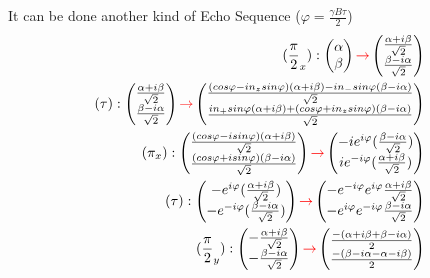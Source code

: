 \documentclass{article}
\begin{document}
It can be done another kind of Echo Sequence ($\varphi=\frac{\gamma B\tau}{2}$)
\begin{equation}\label{eq30}\begin{aligned}
(\frac{\pi}{2}_x):\begin{pmatrix}\alpha \\\beta  \end{pmatrix}\textcolor{red}{\rightarrow}\begin{pmatrix}\frac{\alpha+i\beta}{\sqrt{2}} \\ \frac{\beta-i\alpha}{\sqrt{2}} \end{pmatrix}\\
(\tau):\begin{pmatrix}\frac{\alpha+i\beta}{\sqrt{2}}\\ \frac{\beta-i\alpha}{\sqrt{2}} \end{pmatrix}\textcolor{red}{\rightarrow}\begin{pmatrix}\frac{(cos\varphi-in_zsin\varphi)(\alpha+i\beta)-in_-sin\varphi(\beta-i\alpha)}{\sqrt{2}}\\\frac{in_+sin\varphi(\alpha+i\beta)+(cos\varphi+in_zsin\varphi)(\beta-i\alpha)}{\sqrt{2}} \end{pmatrix}\\
(\pi_x):\begin{pmatrix}\frac{(cos\varphi-isin\varphi)(\alpha+i\beta)}{\sqrt{2}}\\\frac{(cos\varphi+isin\varphi)(\beta-i\alpha)}{\sqrt{2}} \end{pmatrix}\textcolor{red}{\rightarrow}\begin{pmatrix}-ie^{i\varphi}(\frac{\beta-i\alpha}{\sqrt{2}})\\ie^{-i\varphi}(\frac{\alpha+i\beta}{\sqrt{2}}) \end{pmatrix}\\
(\tau):\begin{pmatrix}-e^{i\varphi}(\frac{\alpha+i\beta}{\sqrt{2}})\\ -e^{-i\varphi}(\frac{\beta-i\alpha}{\sqrt{2}}) \end{pmatrix}\textcolor{red}{\rightarrow}\begin{pmatrix} -e^{-i\varphi}e^{i\varphi}\frac{\alpha+i\beta}{\sqrt{2}}\\ -e^{i\varphi}e^{-i\varphi}\frac{\beta-i\alpha}{\sqrt{2}} \end{pmatrix}\\
(\frac{\pi}{2}_y):\begin{pmatrix}-\frac{\alpha+i\beta}{\sqrt{2}}\\-\frac{\beta-i\alpha}{\sqrt{2}} \end{pmatrix}\textcolor{red}{\rightarrow}\begin{pmatrix}\frac{-(\alpha+i\beta+\beta-i\alpha)}{2} \\ \frac{-(\beta-i\alpha-\alpha-i\beta)}{2} \end{pmatrix}
\end{aligned}\end{equation}
\end{document}
